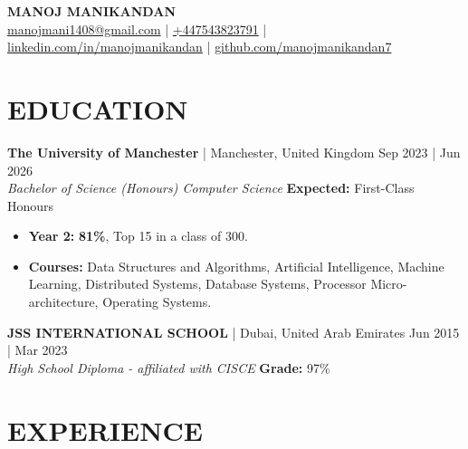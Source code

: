 \documentclass[a4paper,1.5pt]{extarticle}
\begin{document}
\pagestyle{empty}

\begin{center}
\textbf{\Large MANOJ MANIKANDAN}\\[2pt] %
\href{mailto:manojmani1408@gmail.com}{manojmani1408@gmail.com} | \href{tel:447543823791}{+447543823791}  | \href{https://www.linkedin.com/in/manojmanikandan}{linkedin.com/in/manojmanikandan}  |  \href{https://github.com/manojmanikandan7}{github.com/manojmanikandan7}
\end{center}
\section*{EDUCATION}
\textbf{The University of Manchester} | Manchester, United Kingdom \hfill Sep 2023 | Jun 2026\\ %
\textit{Bachelor of Science (Honours) Computer Science} \hfill \textbf{Expected:} First-Class Honours%
\begin{itemize}
    \item \textbf{Year 2: } \textbf{81\%}, Top 15 in a class of 300.
    \item \textbf{Courses:} Data Structures and Algorithms, Artificial Intelligence, Machine Learning, Distributed Systems, Database Systems, Processor Micro-architecture, Operating Systems. %
\end{itemize}

\noindent
\textbf{JSS INTERNATIONAL SCHOOL} | Dubai, United Arab Emirates \hfill Jun 2015 | Mar 2023\\ %
\textit{High School Diploma - affiliated with CISCE} \hfill \textbf{Grade:} 97\% %


\section*{EXPERIENCE}
\end{document}
